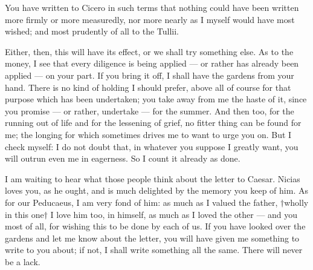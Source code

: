 

 You have written to Cicero in such terms that nothing could have been written more firmly or more measuredly, nor more nearly as I myself would have most wished; and most prudently of all to the Tullii.

 Either, then, this will have its effect, or we shall try something else. As to the money, I see that every diligence is being applied --- or rather has already been applied --- on your part. If you bring it off, I shall have the gardens from your hand. There is no kind of holding I should prefer, above all of course for that purpose which has been undertaken; you take away from me the haste of it, since you promise --- or rather, undertake --- for the summer. And then too, for the running out of life and for the lessening of grief, no fitter thing can be found for me; the longing for which sometimes drives me to want to urge you on. But I check myself: I do not doubt that, in whatever you suppose I greatly want, you will outrun even me in eagerness. So I count it already as done.

 I am waiting to hear what those people think about the letter to Caesar. Nicias loves you, as he ought, and is much delighted by the memory you keep of him. As for our Peducaeus, I am very fond of him: as much as I valued the father, $\dagger$wholly in this one$\dagger$ I love him too, in himself, as much as I loved the other --- and you most of all, for wishing this to be done by each of us. If you have looked over the gardens and let me know about the letter, you will have given me something to write to you about; if not, I shall write something all the same. There will never be a lack.
